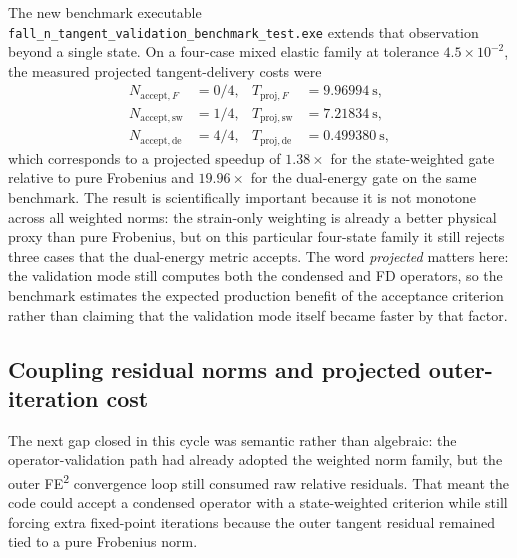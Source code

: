 The new benchmark executable
\texttt{fall\_n\_tangent\_validation\_benchmark\_test.exe} extends that
observation beyond a single state.  On a four-case mixed elastic family at
tolerance \(4.5\times 10^{-2}\), the measured projected tangent-delivery costs
were
\begin{align}
  N_{\mathrm{accept},F} &= 0/4, &
  T_{\mathrm{proj},F} &= 9.96994~\mathrm{s}, \\
  N_{\mathrm{accept},\mathrm{sw}} &= 1/4, &
  T_{\mathrm{proj},\mathrm{sw}} &= 7.21834~\mathrm{s}, \\
  N_{\mathrm{accept},\mathrm{de}} &= 4/4, &
  T_{\mathrm{proj},\mathrm{de}} &= 0.499380~\mathrm{s},
\end{align}
which corresponds to a projected speedup of \(1.38\times\) for the
state-weighted gate relative to pure Frobenius and
\(19.96\times\) for the dual-energy gate on the same benchmark.  The result is
scientifically important because it is not monotone across all weighted norms:
the strain-only weighting is already a better physical proxy than pure
Frobenius, but on this particular four-state family it still rejects three
cases that the dual-energy metric accepts.  The word \emph{projected} matters
here: the validation mode still computes both the condensed and FD operators,
so the benchmark estimates the expected production benefit of the acceptance
criterion rather than claiming that the validation mode itself became faster by
that factor.

\subsection{Coupling residual norms and projected outer-iteration cost}

The next gap closed in this cycle was semantic rather than algebraic: the
operator-validation path had already adopted the weighted norm family, but the
outer FE\textsuperscript{2} convergence loop still consumed raw relative
residuals.  That meant the code could accept a condensed operator with a
state-weighted criterion while still forcing extra fixed-point iterations
because the outer tangent residual remained tied to a pure Frobenius norm.

